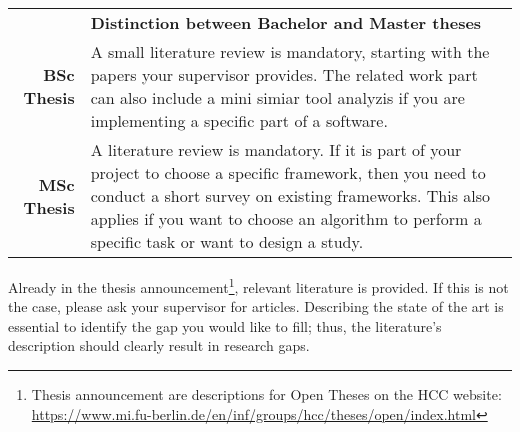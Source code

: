 \begin{table}[htb]
\small
\colorbox{bamacolor}{
\centering
\begin{tabularx}{\textwidth}{@{} r Y @{}}
	&
	\textbf{Distinction between Bachelor and Master theses}\vspace{2mm}\\
    \textbf{BSc Thesis} &
    A small literature review is mandatory, starting with the papers your supervisor provides. The related work part can also include a mini simiar tool analyzis if you are implementing a specific part of a software. \vspace{2mm}\\
	\textbf{MSc Thesis} &
	A literature review is mandatory. If it is part of your project to choose a specific framework, then you need to conduct a short survey on existing frameworks. This also applies if you want to choose an algorithm to perform a specific task or want to design a study. \vspace{2mm}\\

\end{tabularx}
}
\end{table}

Already in the thesis announcement\footnote{Thesis announcement are descriptions for Open Theses on the HCC website: \url{https://www.mi.fu-berlin.de/en/inf/groups/hcc/theses/open/index.html}}, relevant literature is provided. If this is not the case, please ask your supervisor for articles. Describing the state of the art is essential to identify the gap you would like to fill; thus, the literature's description should clearly result in research gaps. 